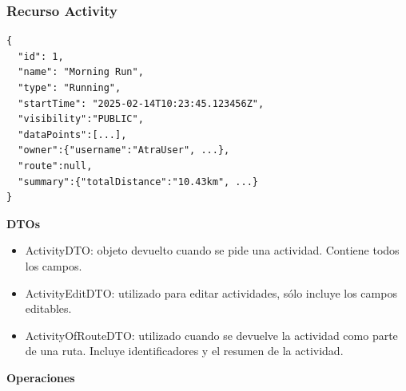 \subsubsection{Recurso Activity}
\begin{lstlisting}[basicstyle=\jsonbasicfont,frame=single,backgroundcolor=\color{white},rulecolor=\color{black},framerule=0.5pt,numbers=none]
{
  "id": 1,
  "name": "Morning Run",
  "type": "Running",
  "startTime": "2025-02-14T10:23:45.123456Z",
  "visibility":"PUBLIC",
  "dataPoints":[...],
  "owner":{"username":"AtraUser", ...},
  "route":null,
  "summary":{"totalDistance":"10.43km", ...}
}
\end{lstlisting}
\textbf{DTOs}
\begin{itemize}
    \item ActivityDTO: objeto devuelto cuando se pide una actividad. Contiene todos los campos.
    \item ActivityEditDTO: utilizado para editar actividades, sólo incluye los campos editables.
    \item ActivityOfRouteDTO: utilizado cuando se devuelve la actividad como parte de una ruta. Incluye identificadores y el resumen de la actividad.
\end{itemize}
\textbf{Operaciones}
